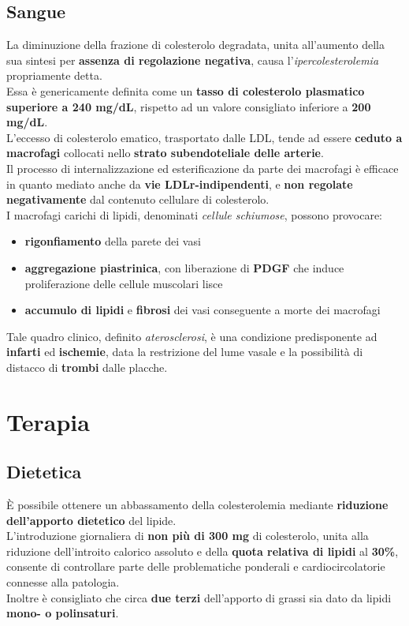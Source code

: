 \documentclass[a4paper, 12pt]{article}
\begin{document}
\begin{titlepage}
\subsection{Sangue}
La diminuzione della frazione di colesterolo degradata, unita all'aumento della sua sintesi per \textbf{assenza di regolazione negativa}, causa l'\textit{ipercolesterolemia} propriamente detta.\\
Essa è genericamente definita come un \textbf{tasso di colesterolo plasmatico superiore a 240 mg/dL}, rispetto ad un valore consigliato inferiore a \textbf{200 mg/dL}.\\
L'eccesso di colesterolo ematico, trasportato dalle LDL, tende ad essere \textbf{ceduto a macrofagi} collocati nello \textbf{strato subendoteliale delle arterie}.\\
Il processo di internalizzazione ed esterificazione da parte dei macrofagi è efficace in quanto mediato anche da \textbf{vie LDLr-indipendenti}, e \textbf{non regolate negativamente} dal contenuto cellulare di colesterolo.\\
I macrofagi carichi di lipidi, denominati \textit{cellule schiumose}, possono provocare:
\begin{itemize}
\item \textbf{rigonfiamento} della parete dei vasi
\item \textbf{aggregazione piastrinica}, con liberazione di \textbf{PDGF} che induce proliferazione delle cellule muscolari lisce
\item \textbf{accumulo di lipidi} e \textbf{fibrosi} dei vasi conseguente a morte dei macrofagi
\end{itemize}
Tale quadro clinico, definito \textit{aterosclerosi}, è una condizione predisponente ad \textbf{infarti} ed \textbf{ischemie}, data la restrizione del lume vasale e la possibilità di distacco di \textbf{trombi} dalle placche.

\section{Terapia}

\subsection{Dietetica}
È possibile ottenere un abbassamento della colesterolemia mediante \textbf{riduzione dell'apporto dietetico} del lipide.\\
L'introduzione giornaliera di \textbf{non più di 300 mg} di colesterolo, unita alla riduzione dell'introito calorico assoluto e della \textbf{quota relativa di lipidi} al \textbf{30\%}, consente di controllare parte delle problematiche ponderali e cardiocircolatorie connesse alla patologia.\\
Inoltre è consigliato che circa \textbf{due terzi} dell'apporto di grassi sia dato da lipidi \textbf{mono- o polinsaturi}.


\end{titlepage}
\end{document}
